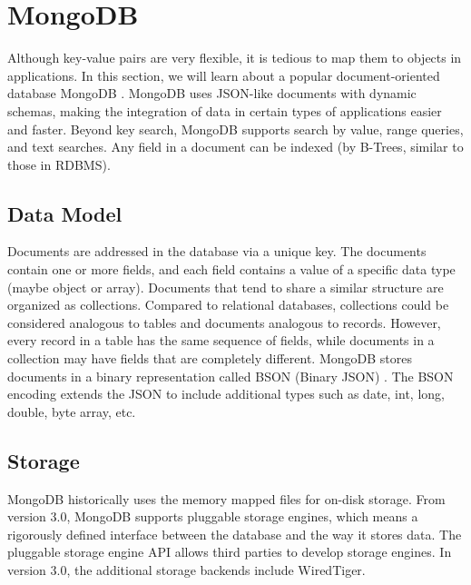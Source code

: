 \documentclass[11pt]{book}
\begin{document}
\section[MongoDB]
{MongoDB}
Although key-value pairs are very flexible, it is tedious to map them to objects in applications. In this section, we will learn about a popular document-oriented database MongoDB \cite{MongoDB}. MongoDB uses JSON-like documents with dynamic schemas, making the integration of data in certain types of applications easier and faster. Beyond key search, MongoDB supports search by value, range queries, and text searches. Any field in a document can be indexed (by B-Trees, similar to those in RDBMS).

\subsection{Data Model}

Documents are addressed in the database via a unique key. The documents contain one or more fields, and each field contains a value of a specific data type (maybe object or array). Documents that tend to share a similar structure are organized as collections. Compared to relational databases, collections could be considered analogous to tables and documents analogous to records. However, every record in a table has the same sequence of fields, while documents in a collection may have fields that are completely different. MongoDB stores documents in a binary representation called BSON (Binary JSON) \cite{BSON}. The BSON encoding extends the JSON to include additional types such as date, int, long, double, byte array, etc.

\subsection{Storage}
MongoDB historically uses the memory mapped files for on-disk storage. From version 3.0, MongoDB supports pluggable storage engines, which means a rigorously defined interface between the database and the way it stores data. The pluggable storage engine API allows third parties to develop storage engines. In version 3.0, the additional storage backends include WiredTiger.
\end{document}
